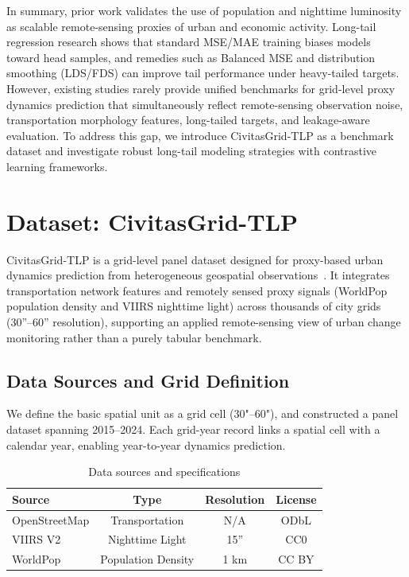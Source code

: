 \documentclass[preprint,12pt]{elsarticle}
\begin{document}
In summary, prior work validates the use of population and nighttime luminosity as scalable remote-sensing proxies of urban and economic activity. Long-tail regression research shows that standard MSE/MAE training biases models toward head samples, and remedies such as Balanced MSE and distribution smoothing (LDS/FDS) can improve tail performance under heavy-tailed targets. However, existing studies rarely provide unified benchmarks for grid-level proxy dynamics prediction that simultaneously reflect remote-sensing observation noise, transportation morphology features, long-tailed targets, and leakage-aware evaluation. To address this gap, we introduce CivitasGrid-TLP as a benchmark dataset and investigate robust long-tail modeling strategies with contrastive learning frameworks.



\section{Dataset: CivitasGrid-TLP}

CivitasGrid-TLP is a grid-level panel dataset designed for proxy-based urban dynamics prediction from heterogeneous geospatial observations~\cite{huang_2026_18144416}. It integrates transportation network features and remotely sensed proxy signals (WorldPop population density and VIIRS nighttime light) across thousands of city grids (30''--60'' resolution), supporting an applied remote-sensing view of urban change monitoring rather than a purely tabular benchmark.

\subsection{Data Sources and Grid Definition}

We define the basic spatial unit as a grid cell (30"–60"), and constructed a panel dataset spanning 2015--2024. Each grid-year record links a spatial cell with a calendar year, enabling year-to-year dynamics prediction.


\begin{table}[htbp]
    \centering

    \begin{tabular}{lccc}
        \toprule
        \textbf{Source} & \textbf{Type} & \textbf{Resolution} & \textbf{License}\\
        \midrule
         OpenStreetMap & Transportation & N/A & ODbL \\
         VIIRS V2 & Nighttime Light & 15'' & CC0 \\
         WorldPop & Population Density & 1 km & CC BY \\
        \bottomrule
    \end{tabular}
    \caption{Data sources and specifications}
    \label{tab:datasources}
    
\end{table}
\end{document}
